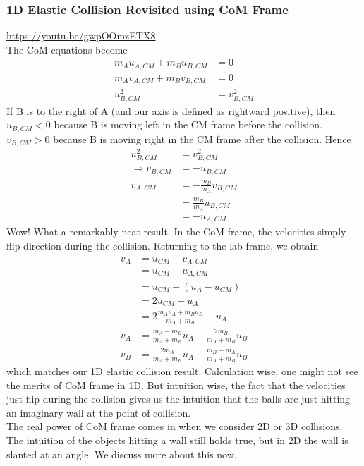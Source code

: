 \documentclass{article}
\begin{document}
\subsubsection{1D Elastic Collision Revisited using CoM Frame}
\url{https://youtu.be/gwpOOmzETX8}\\
The CoM equations become
\begin{align}
    m_A u_{A,CM} + m_B u_{B,CM} &= 0 \\
    m_A v_{A,CM} + m_B v_{B,CM} &= 0 \\
    u_{B,CM}^2 &= v_{B,CM}^2 
\end{align}
If B is to the right of A (and our axis is defined as rightward positive), then $u_{B,CM} < 0$ because B is moving left in the CM frame before the collision. $v_{B,CM} > 0$ because B is moving right in the CM frame after the collision. Hence 
\begin{align}
    u_{B,CM}^2 &= v_{B,CM}^2 \\
    \Rightarrow v_{B,CM} &= -u_{B,CM} \\
    v_{A,CM} &= -\frac{m_B}{m_A} v_{B,CM} \\ 
    &= \frac{m_B}{m_A} u_{B,CM} \\
    &= - u_{A,CM}
\end{align}
Wow! What a remarkably neat result. In the CoM frame, the velocities simply flip direction during the collision. Returning to the lab frame, we obtain 
\begin{align}
    v_A &= u_{CM} + v_{A,CM} \\
    &= u_{CM} - u_{A,CM} \\
    &= u_{CM} - (u_A - u_{CM}) \\
    &= 2 u_{CM} - u_A \\
    &= 2 \frac{m_A u_A + m_B u_B}{m_A + m_B} - u_A\\
    v_A &= \frac{m_A - m_B}{m_A + m_B} u_A + \frac{2m_B}{m_A + m_B} u_B \\
    v_B &= \frac{2m_A}{m_A + m_B} u_A + \frac{m_B - m_A}{m_A + m_B} u_B
\end{align}
which matches our 1D elastic collision result. Calculation wise, one might not see the merits of CoM frame in 1D. But intuition wise, the fact that the velocities just flip during the collision gives us the intuition that the balls are just hitting an imaginary wall at the point of collision. \\[10pt]
The real power of CoM frame comes in when we consider 2D or 3D collisions. The intuition of the objects hitting a wall still holds true, but in 2D the wall is slanted at an angle. We discuss more about this now.
\end{document}

